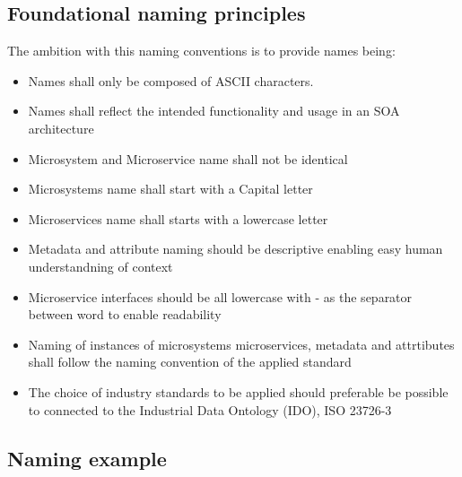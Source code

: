 \documentclass[a4paper]{arrowhead}
\begin{document}
\subsection{Foundational naming principles}
\label{sec:principles}
The ambition with this naming conventions is to provide names being:
\begin{itemize}
\item Names shall only be composed of ASCII characters.

\item Names shall reflect the intended functionality and usage in an SOA
  architecture
\item Microsystem and Microservice name shall not be identical
\item Microsystems name shall start with a Capital letter
\item Microservices name shall starts with a lowercase letter

\item Metadata and attribute naming should be descriptive enabling
  easy human understandning of context

\item Microservice interfaces should be all lowercase with - as the
  separator between word to enable readability
  
\item Naming of instances of microsystems microservices, metadata and
  attrtibutes shall follow  the naming convention of the
  applied standard
  
\item The choice of industry standards to be applied should preferable
  be possible to connected to the Industrial Data Ontology (IDO), ISO 23726-3
\end{itemize}


\subsection{Naming example}
\label{sec:examples}
\end{document}

